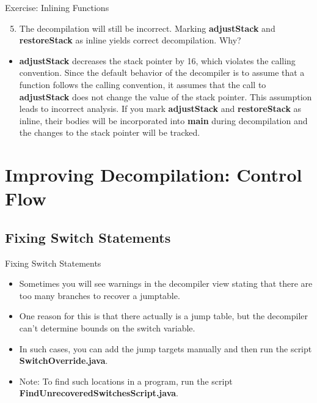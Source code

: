 \documentclass{beamer}
\begin{document}
\begin{frame}
\begin{block}{Exercise: Inlining Functions}
\begin{enumerate}
\setcounter{enumi}{4}
\item The decompilation will still be incorrect. Marking \textbf{adjustStack} and \textbf{restoreStack} as inline yields correct decompilation.  Why?
\end{enumerate}
\pause
\begin{itemize}
\item \textbf{adjustStack} decreases the stack pointer by 16, which violates the calling convention.  Since the default behavior of the decompiler is to assume that a function follows the
calling convention, it assumes that the call to \textbf{adjustStack} does not change the value of the stack pointer. This assumption leads to incorrect analysis. If you mark
\textbf{adjustStack} and \textbf{restoreStack} as inline, their bodies will be incorporated into \textbf{main} during decompilation and the changes to the stack pointer will be tracked.
\end{itemize}
\end{block}
\end{frame}




\section{Improving Decompilation: Control Flow}

\subsection{Fixing Switch Statements}
\begin{frame}
\begin{block}{Fixing Switch Statements}
\begin{itemize}
\item Sometimes you will see warnings in the decompiler view stating that there are too many branches to recover a jumptable. 
\item One reason for this is that there actually is a jump table, but the decompiler can't determine bounds on the switch variable.
\item In such cases, you can add the jump targets manually and then run the script \textbf{SwitchOverride.java}. 
\item Note: To find such locations in a program, run the script \textbf{FindUnrecoveredSwitchesScript.java}.
\end{itemize}
\end{block}
\end{frame}
\end{document}
